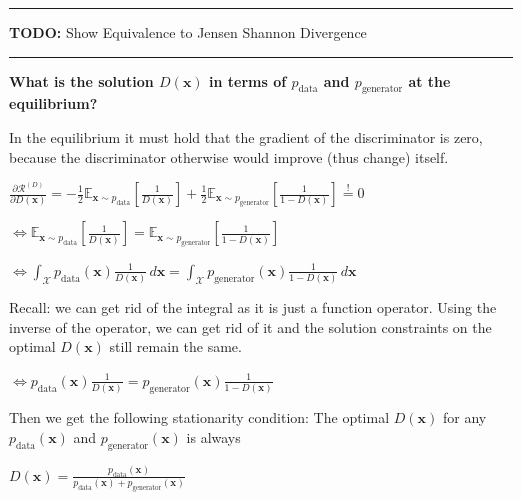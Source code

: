 \documentclass[a2paper,4pt]{extarticle}
\newcommand{\cR}{\mathcal{R}}
\newcommand{\cX}{\mathcal{X}}
\newcommand{\Exp}[2][]{{\mathbb{E}_{#1}}\left[ #2
\right]}
\newcommand{\mbeq}{\stackrel{!}{=}}
\renewcommand{\vec}[1]{\mathbf{#1}}
\newcommand{\vx}{\vec{x}}
\newcommand{\todo}[1]{\textbf{TODO:} #1}
\newcommand{\todo}[1]{%
}
\newcommand{\sep}{\vspace{0pt}\noindent\hrule\vspace{0pt}}
\newcommand{\sep}{\vspace{5pt}\noindent\hrule\vspace{5pt}}
\begin{document}
\begin{landscape}
\begin{multicols*}{7}
\sep

\todo{Show Equivalence to Jensen Shannon Divergence}

\sep

\textbf{What is the solution $D(\vx)$ in terms of $p_{\text{data}}$ and
$p_{\text{generator}}$ at the equilibrium?}

In the equilibrium it must hold that the gradient of the discriminator is zero,
because the discriminator otherwise would improve (thus change) itself.

$
\frac{\partial \cR^{(D)}}{\partial D(\vx)}
=
-\frac{1}{2}
\Exp[\vx\sim p_{\text{data}}]{\frac{1}{D(\vx)}}
+\frac{1}{2}
\Exp[\vx\sim p_{\text{generator}}]{\frac{1}{1-D(\vx)}}
\mbeq 0
$

$
\Longleftrightarrow
\Exp[\vx\sim p_{\text{data}}]{\frac{1}{D(\vx)}}
=
\Exp[\vx\sim p_{\text{generator}}]{\frac{1}{1-D(\vx)}}
$

$
\Longleftrightarrow
\int_{\cX} p_{\text{data}}(\vx)\frac{1}{D(\vx)}\,d\vx
=
\int_{\cX} p_{\text{generator}}(\vx)\frac{1}{1-D(\vx)}\,d\vx
$

Recall: we can get rid of the integral as it is just a function operator. Using
the inverse of the operator, we can get rid of it and the solution constraints
on the optimal $D(\vx)$ still remain the same.

$
\Longleftrightarrow
p_{\text{data}}(\vx)\frac{1}{D(\vx)}
=
p_{\text{generator}}(\vx)\frac{1}{1-D(\vx)}
$

Then we get the following stationarity
condition: The optimal $D(\vx)$ for any $p_{\text{data}}(\vx)$ and
$p_{\text{generator}}(\vx)$ is always

$
D(\vx)
=
\frac{p_{\text{data}}(\vx)}{p_{\text{data}}(\vx) + p_{\text{generator}}(\vx)}
$


\end{multicols*}
\end{landscape}
\end{document}
